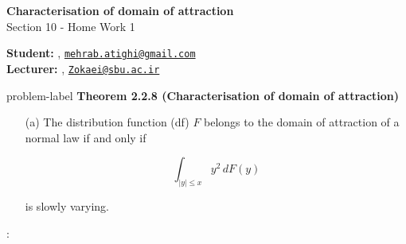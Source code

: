 	






		\begin{Large}
		\textsf{\textbf{Characterisation of domain of attraction}}\\
		Section 10 - Home Work 1
	\end{Large}
	
	\vspace{1ex}
	
	\textsf{\textbf{Student:}} , \href{mailto:mehrab.atighi@gmail.com}{\texttt{mehrab.atighi@gmail.com}}\\
	\textsf{\textbf{Lecturer:}} , \href{mailto:Zokaei@sbu.ac.ir}{\texttt{Zokaei@sbu.ac.ir}}
	
	
	\vspace{2ex}
	
	\begin{problem}{}{problem-label}
			\textbf{Theorem 2.2.8 (Characterisation of domain of attraction)}
		
		\begin{itemize}
			\item[(a)] The distribution function (df) \( F \) belongs to the domain of attraction of a normal law if and only if
			
			
			\[
			\int_{|y| \leq x} y^2 \, dF(y)
			\]
			
			
			is slowly varying.

		\end{itemize}
		\cite{Embrechts.etal1997}:
	\end{problem}
	
